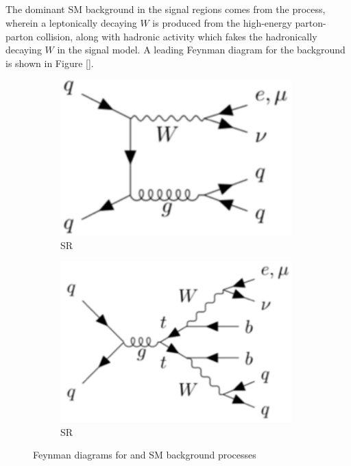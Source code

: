 \subsection{\wjets}
\label{sec:wjets_description}

The dominant SM background in the signal regions comes from the \wjets process, wherein a leptonically decaying \(W\) is produced from the high-energy parton-parton collision, along with hadronic activity which fakes the hadronically decaying \(W\) in the signal model. A leading Feynman diagram for the \wjets background is shown in Figure \ref{}.

\begin{figure}[h]
  \centering
     \begin{subfigure}{0.49\textwidth}
     \includegraphics[width = 0.98\textwidth]{Figures/4/Fey_Wjets.pdf}
    \caption{\merged SR}
    \label{fig:Wjets_Feynman}
     \end{subfigure}
    \begin{subfigure}{0.49\textwidth}
     \includegraphics[width = 0.98\textwidth]{Figures/4/Fey_ttbar.pdf}
     \caption{\resolved SR}
     \label{fig:ttbar_Feynman}
     \end{subfigure}
     \caption{Feynman diagrams for \wjets and \ttbar SM background processes}
     \label{fig:Feynman_bkgs}
  \end{figure}

